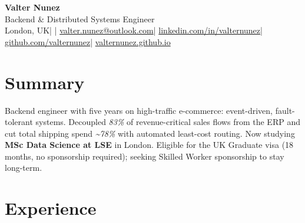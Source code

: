 \documentclass[10pt,a4paper]{article}
\begin{document}
{\Huge\bfseries Valter Nunez}\\[3pt]
{\color{soft}\large Backend \& Distributed Systems Engineer}\\[5pt]
{\footnotesize
London, UK\hspace{0.5em}\textcolor{soft}{|}\hspace{0.5em}%
\ifdefined\cvphone\href{tel:\cvphonetel}{\cvphone}\hspace{0.5em}\textcolor{soft}{|}\hspace{0.5em}\fi%
\href{mailto:valter.nunez@outlook.com}{valter.nunez@outlook.com}\hspace{0.5em}\textcolor{soft}{|}\hspace{0.5em}%
\href{https://www.linkedin.com/in/valternunez}{linkedin.com/in/valternunez}\hspace{0.5em}\textcolor{soft}{|}\hspace{0.5em}%
\href{https://github.com/valternunez}{github.com/valternunez}\hspace{0.5em}\textcolor{soft}{|}\hspace{0.5em}%
\href{https://valternunez.github.io}{valternunez.github.io}
}

\section*{Summary}
Backend engineer with five years on high-traffic e-commerce: event-driven, fault-tolerant
systems. Decoupled \textit{83\%} of revenue-critical sales flows from the ERP and cut total shipping
spend \textit{\textasciitilde78\%} with automated least-cost routing. Now studying \textbf{MSc Data
Science at LSE} in London. Eligible for the UK Graduate visa (18 months, no sponsorship required); seeking Skilled Worker sponsorship to stay long-term.

\section*{Experience}
\end{document}
